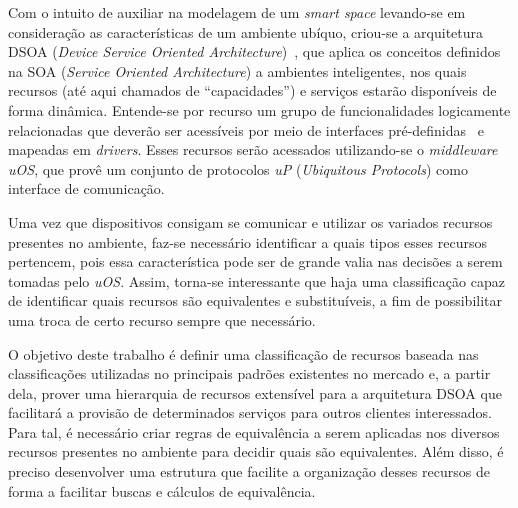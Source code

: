 Com o intuito de auxiliar na modelagem de um \emph{smart space} levando-se em consideração as características de um ambiente ubíquo, criou-se a arquitetura DSOA (\emph{Device Service Oriented Architecture})~\cite{buzetoDSOA2010}, que aplica os conceitos definidos na SOA (\emph{Service Oriented Architecture}) a ambientes inteligentes, nos quais recursos (até aqui chamados de ``capacidades'') e serviços estarão disponíveis de forma dinâmica. Entende-se por recurso um grupo de funcionalidades logicamente relacionadas que deverão ser acessíveis por meio de interfaces pré-definidas~\cite{buzeto2010} e mapeadas em \emph{drivers}. Esses recursos serão acessados utilizando-se o \emph{middleware} \emph{uOS}, que provê um conjunto de protocolos \emph{uP} (\emph{Ubiquitous Protocols}) como interface de comunicação.

Uma vez que dispositivos consigam se comunicar e utilizar os variados recursos presentes no ambiente, faz-se necessário identificar a quais tipos esses recursos pertencem, pois essa característica pode ser de grande valia nas decisões a serem tomadas pelo \emph{uOS}. Assim, torna-se interessante que haja uma classificação capaz de identificar quais recursos são equivalentes e substituíveis, a fim de possibilitar uma troca de certo recurso sempre que necessário.

O objetivo deste trabalho é definir uma classificação de recursos baseada nas classificações utilizadas no principais padrões existentes no mercado e, a partir dela, prover uma hierarquia de recursos extensível para a arquitetura DSOA que facilitará a provisão de determinados serviços para outros clientes interessados. Para tal, é necessário criar regras de equivalência a serem aplicadas nos diversos recursos presentes no ambiente para decidir quais são equivalentes. Além disso, é preciso desenvolver uma estrutura que facilite a organização desses recursos de forma a facilitar buscas e cálculos de equivalência.


